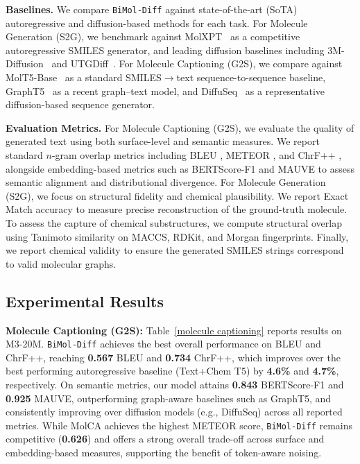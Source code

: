 \noindent \textbf{Baselines.} We compare \texttt{BiMol-Diff} against state-of-the-art (SoTA) autoregressive and diffusion-based methods for each task. 
For Molecule Generation (S2G), we benchmark against MolXPT~\citep{liu-etal-2023-molxpt} as a competitive autoregressive SMILES generator, and leading diffusion baselines including 3M-Diffusion~\citep{zhu20243mdiffusionlatentmultimodaldiffusion} and UTGDiff~\citep{xiang2025instructionbasedmoleculargraphgeneration}.
For Molecule Captioning (G2S), we compare against MolT5-Base~\citep{edwards-etal-2022-translation} as a standard SMILES$\rightarrow$text sequence-to-sequence baseline, GraphT5~\citep{kim2025grapht5unifiedmoleculargraphlanguage} as a recent graph--text model, and DiffuSeq~\citep{gong2023diffuseqsequencesequencetext} as a representative diffusion-based sequence generator.


\noindent \textbf{Evaluation Metrics.} For Molecule Captioning (G2S), we evaluate the quality of generated text using both surface-level and semantic measures. We report standard $n$-gram overlap metrics including BLEU \citep{papineni2002bleu}, METEOR \citep{banerjee2005meteor}, and ChrF++ \citep{popovic-2015-chrf}, alongside embedding-based metrics such as BERTScore-F1 \citep{zhang2020bertscoreevaluatingtextgeneration} and MAUVE \citep{pillutla2023mauvescoresgenerativemodels} to assess semantic alignment and distributional divergence. For Molecule Generation (S2G), we focus on structural fidelity and chemical plausibility. We report Exact Match accuracy to measure precise reconstruction of the ground-truth molecule. To assess the capture of chemical substructures, we compute structural overlap using Tanimoto similarity on MACCS, RDKit, and Morgan fingerprints. Finally, we report chemical validity to ensure the generated SMILES strings correspond to valid molecular graphs.

\subsection{Experimental Results}
\noindent \textbf{Molecule Captioning (G2S):} Table~\ref{molecule captioning} reports results on M3-20M. \texttt{BiMol-Diff} achieves the best overall performance on BLEU and ChrF++, reaching \textbf{0.567} BLEU and \textbf{0.734} ChrF++, which improves over the best performing autoregressive baseline (Text+Chem T5) by \textbf{4.6\%} and \textbf{4.7\%}, respectively. On semantic metrics, our model attains \textbf{0.843} BERTScore-F1 and \textbf{0.925} MAUVE, outperforming graph-aware baselines such as GraphT5, and consistently improving over diffusion models (e.g., DiffuSeq) across all reported metrics. While MolCA achieves the highest METEOR score, \texttt{BiMol-Diff} remains competitive (\textbf{0.626}) and offers a strong overall trade-off across surface and embedding-based measures, supporting the benefit of token-aware noising.


